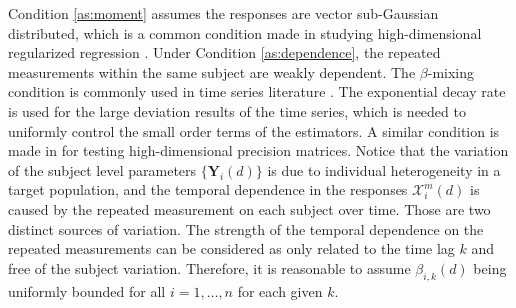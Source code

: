 \documentclass[12pt]{article}
\theoremstyle{definition}
\newcommand{\bX}{{\mathbf X}}
\newcommand{\bY}{{\mathbf Y}}
\begin{document}

Condition \ref{as:moment} assumes the responses are vector sub-Gaussian distributed, which is a common condition made in studying high-dimensional 
regularized regression \citep{vanderGeerRitov2014, Ning17}. %
Under Condition \ref{as:dependence}, the repeated measurements within the same subject are weakly dependent.
The $\beta$-mixing condition is commonly used in time series literature \citep{bradley2005basic}. 
The exponential decay rate is used for the large deviation results of the time series, which is needed to uniformly control the small order terms of the estimators.
A similar condition is made in \cite{ChangQiuYao_2016} for testing high-dimensional precision matrices. 
Notice that the variation of the subject level parameters $\{\bY_{i}(d)\}$ is due to 
individual heterogeneity in a target population, and the temporal dependence in the responses $\mathcal{X}_i^m(d)$ is caused by the repeated measurement on each subject over time. 
Those are two distinct sources of variation. The strength of the temporal dependence on the repeated measurements can be considered as only related to the time lag $k$ and free of the subject variation.
Therefore, it is reasonable to assume $\beta_{i, k}(d)$ being uniformly bounded for all $i = 1, \ldots, n$ for each given $k$.
\end{document}
